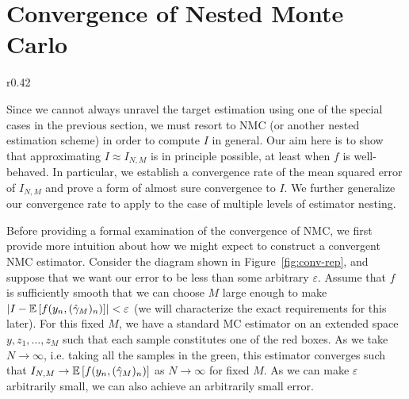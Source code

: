 
\section{Convergence of Nested Monte Carlo}
\label{sec:convergence}

\begin{wrapfigure}{r}{0.42\textwidth}
	\vspace{-12pt}
	\centering 
	\resizebox{.4\textwidth}{!}{
		
	}
	\caption{Convergence representation \label{fig:conv-rep}}
	\vspace{-10pt}
\end{wrapfigure}

Since we cannot always unravel the target estimation using one of the special cases in the previous section, we must resort to NMC (or another nested estimation scheme) in order to compute $I$ in general. 
Our aim here is to show that
approximating $I \approx I_{N,M}$ is in principle possible, at least when $f$ is
well-behaved. In particular, we establish a convergence rate of 
the mean squared error of $I_{N,M}$ and prove a form of almost sure convergence to
$I$.  We further generalize our convergence rate to apply to the case of multiple
levels of estimator nesting.


Before providing a formal examination of the convergence of NMC, we first provide more
intuition about how we might expect to construct a convergent NMC estimator.  Consider the
diagram shown in Figure~\ref{fig:conv-rep}, and suppose that we want our error to be
less than some arbitrary $\varepsilon$.  Assume that $f$ is sufficiently smooth 
that we can choose $M$ large enough to make
$\left|I-\mathbb{E}\left[f(y_n,(\hat{\gamma}_M)_n)\right]\right| < \varepsilon$
(we will characterize the exact requirements for this later).  For this fixed
$M$, we have a standard MC estimator on an extended space $y,z_1,\dots,z_M$ such that each
sample constitutes one of the red boxes.  As we take $N\rightarrow \infty$, i.e. taking
all the samples in the green, this estimator converges such that $I_{N,M}
\to \mathbb{E}\left[f(y_n,(\hat{\gamma}_M)_n)\right]$ as $N \to \infty$ for fixed $M$.  As we can
make $\varepsilon$ arbitrarily small, we can also achieve an arbitrarily small error.

